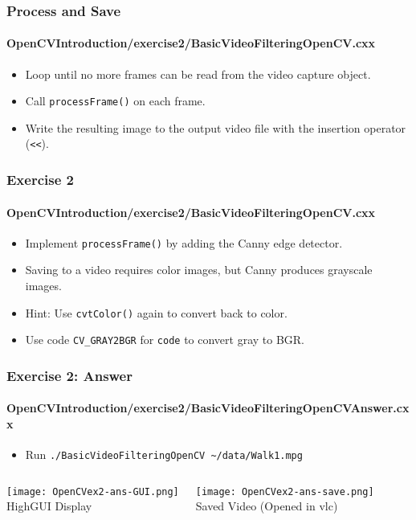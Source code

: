 \begin{frame}
\frametitle{Process and Save}
\framesubtitle{OpenCVIntroduction/exercise2/BasicVideoFilteringOpenCV.cxx}
\begin{center}
\begin{itemize}
\item Loop until no more frames can be read from the video capture object.
\item Call {\tt\small processFrame()} on each frame.
\item Write the resulting image to the output video file with the insertion operator ({\tt\small <<}).
\end{itemize}
\end{center}
\end{frame}


\begin{frame}
\frametitle{Exercise 2}
\framesubtitle{OpenCVIntroduction/exercise2/BasicVideoFilteringOpenCV.cxx}
\begin{center}
\begin{itemize}
\item Implement {\tt\small processFrame()} by adding the Canny edge detector.
\pause
\item Saving to a video requires color images, but Canny produces grayscale images.
\item Hint: Use {\tt\small cvtColor()} again to convert back to color.
\item Use code {\tt\small CV\_GRAY2BGR} for {\tt\small code} to convert gray to BGR.
\end{itemize}
\end{center}
\end{frame}


\begin{frame}[fragile]
\frametitle{Exercise 2: Answer}
\framesubtitle{OpenCVIntroduction/exercise2/BasicVideoFilteringOpenCVAnswer.cxx}
\begin{center}
\begin{itemize}
\item Run \verb|./BasicVideoFilteringOpenCV ~/data/Walk1.mpg|
\end{itemize}
\pause
\begin{columns}[c]
\begin{center}
\texttt{[image: OpenCVex2-ans-GUI.png]} \\
HighGUI Display
\end{center}
\begin{center}
\texttt{[image: OpenCVex2-ans-save.png]} \\
Saved Video (Opened in vlc)
\end{center}
\end{columns}
\end{center}
\end{frame}
